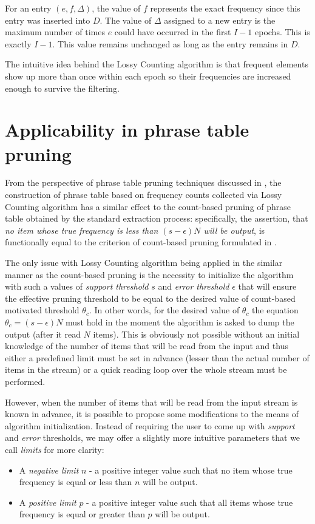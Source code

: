 For an entry $(e, f, \Delta)$, the value of $f$ represents the exact frequency
since this entry was inserted into $D$.
The value of $\Delta$ assigned to a new entry is the maximum number of times
$e$ could have occurred in the first $I-1$ epochs. This is exactly $I-1$.
This value remains unchanged as long as the entry remains in $D$.

The intuitive idea behind the Lossy Counting algorithm is that frequent elements
show up more than once within each epoch so their frequencies are increased enough
to survive the filtering.

\section{Applicability in phrase table pruning}
\label{sec:lossy-counting-applicability}

From the perspective of phrase table pruning techniques discussed in
, the construction of phrase table based on frequency counts
collected via Lossy Counting algorithm has a similar effect to the count-based pruning of
phrase table obtained by the standard extraction process:
specifically, the assertion, that \emph{no item whose true frequency is less than
$(s - \epsilon)N$ will be output}, is functionally equal to the criterion of
count-based pruning formulated in .

The only issue with Lossy Counting algorithm being applied in the similar manner as
the count-based pruning is the necessity to initialize the algorithm with such a values of
\emph{support threshold} $s$ and \emph{error threshold} $\epsilon$ that will ensure
the effective pruning threshold to be equal to the desired value of count-based
motivated threshold $\theta_{c}$.
In other words, for the desired value of $\theta_{c}$ the equation $\theta_{c} = (s - \epsilon)N$
must hold in the moment the algorithm is asked to dump the output (after it read $N$ items).
This is obviously not possible without an initial knowledge of the number of items
that will be read from the input and thus either a predefined limit must be set in advance
(lesser than the actual number of items in the stream) or a quick reading loop over the whole
stream must be performed.

However, when the number of items that will be read from the input stream is known
in advance, it is possible to propose some modifications to the means of algorithm
initialization.
Instead of requiring the user to come up with \emph{support} and \emph{error} thresholds,
we may offer a slightly more intuitive parameters that we call \emph{limits} for more clarity:
\begin{itemize}
  \item A \emph{negative limit} $n$ - a positive integer value such that no item
    whose true frequency is equal or less than $n$ will be output.
  \item A \emph{positive limit} $p$ - a positive integer value such that all items
    whose true frequency is equal or greater than $p$ will be output.
\end{itemize}

